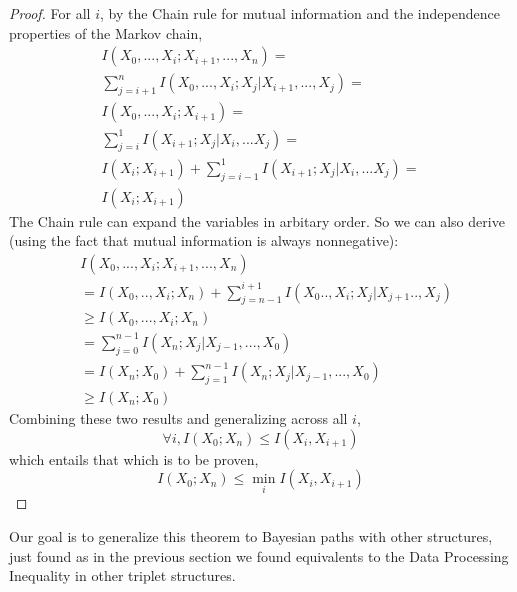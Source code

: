 \documentclass[../thesis.tex]{subfiles}
\begin{document}
\begin{proof}
  \label{cdpi-prf}
  For all $i$, by the Chain rule for mutual information
  and the independence properties of the Markov chain,
  \begin{equation}
    \label{cdpi-prf-eq1}
    \begin{split}
      I(X_0, ..., X_{i} ; X_{i+1},...,X_n) = \\
      \sum_{j=i+1}^{n} I(X_0,...,X_{i}; X_j \vert X_{i+1},...,X_j) = \\
      I(X_0,...,X_{i}; X_{i+1}) = \\
      \sum_{j=i}^{1} I(X_{i+1}; X_{j} \vert X_i,...X_j) = \\
      I(X_i;X_{i+1}) + \sum_{j=i-1}^{1} I(X_{i+1}; X_{j} \vert X_i,...X_j) = \\
      I(X_i;X_{i+1})
    \end{split}
  \end{equation}
  The Chain rule can expand the variables in arbitary order.
  So we can also derive (using the fact that mutual information
  is always nonnegative):
  \begin{equation}
    \label{cdpi-prf-eq2}
    \begin{split}
      & I(X_0, ..., X_{i} ; X_{i+1},...,X_n) \\
      &= I(X_0, .., X_{i} ; X_n) + \sum_{j=n-1}^{i+1} I(X_{0}..,X_{i}; X_j \vert X_{j+1}..,X_j) \\
      &\geq I(X_0, ..., X_{i} ; X_n) \\
      &= \sum_{j = 0}^{n-1} I(X_n ; X_j \vert X_{j-1}, ... , X_0) \\
      &= I(X_n; X_0) + \sum_{j=1}^{n-1} I(X_n; X_j \vert X_{j-1}, ..., X_0) \\
      &\geq I(X_n; X_0)
    \end{split}
  \end{equation}
  Combining these two results and generalizing across all $i$,
  \begin{equation}
    \forall i, I(X_0;X_n) \leq I(X_i,X_{i+1})
  \end{equation}
  which entails that which is to be proven,
  \begin{equation}
    I(X_0;X_n) \leq \min_i I(X_i,X_{i+1})
  \end{equation}
\end{proof}

Our goal is to generalize this theorem to Bayesian paths
with other structures, just found as in the previous section
we found equivalents to the Data Processing Inequality in
other triplet structures.
\end{document}
